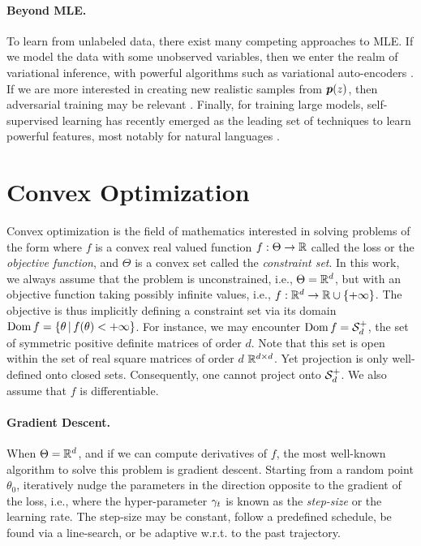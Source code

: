 \paragraph{Beyond MLE.}
To learn from unlabeled data, there exist many competing approaches to MLE.
If we model the data with some unobserved variables, then we enter the realm of variational inference, with powerful algorithms such as variational auto-encoders \citep{kingma2013auto}.
If we are more interested in creating new realistic samples from $\bm{p}(z)$, then adversarial training may be relevant \citep{goodfellow2014generative}.
Finally, for training large models, self-supervised learning has recently emerged as the leading set of techniques to learn powerful features, most notably for natural languages \citep{peters2018deep,devlin2018bert}.


\section{Convex Optimization}
Convex optimization is the field of mathematics interested in solving problems of the form
where $f$ is a convex real valued function $f:\Theta \rightarrow \mathbb{R}$ called the loss or the \emph{objective function}, and $\Theta$ is a convex set called the \emph{constraint set}.
In this work, we always assume that the problem is unconstrained, i.e., $\Theta = \mathbb{R}^d$,
but with an objective function taking possibly infinite values, i.e., $f: \mathbb{R}^d \rightarrow \mathbb{R} \cup \{+\infty\}$.
The objective is thus implicitly defining a constraint set via its domain $\operatorname{\mathrm{Dom}} f = \{ \theta \,\vert\, f(\theta) < +\infty \}$.
For instance, we may encounter $\operatorname{\mathrm{Dom}} f = {\mathcal S}_d^+$, the set of symmetric positive definite matrices of order $d$. Note that this set is open within the set of real square matrices of order $d$ $\mathbb{R}^{d\times d}$. Yet projection is only well-defined onto closed sets. Consequently, one cannot project onto ${\mathcal S}_d^+$. 
We also assume that $f$ is differentiable.

\paragraph{Gradient Descent.}
When $\Theta = \mathbb{R}^d$, and if we can compute derivatives of $f$, the most well-known algorithm to solve this problem is gradient descent.
Starting from a random point $\theta_0$, iteratively nudge the parameters in the direction opposite to the gradient of the loss, i.e.,
where the hyper-parameter $\gamma_t$ is known as the \emph{step-size} or the learning rate.
The step-size may be constant, follow a predefined schedule, be found via a line-search, or be adaptive w.r.t. to the past trajectory.

